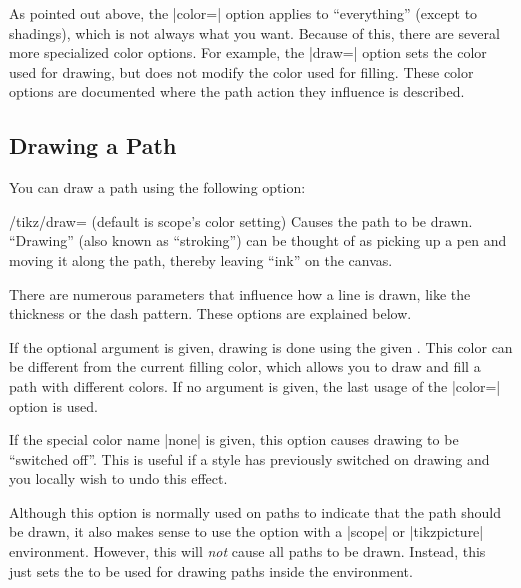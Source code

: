 As pointed out above, the |color=| option applies to ``everything'' (except to
shadings), which is not always what you want. Because of this, there are
several more specialized color options. For example, the |draw=| option sets
the color used for drawing, but does not modify the color used for filling.
These color options are documented where the path action they influence is
described.


\subsection{Drawing a Path}

You can draw a path using the following option:
%
\begin{key}{/tikz/draw= (default \normalfont is scope's color setting)}
    Causes the path to be drawn. ``Drawing'' (also known as ``stroking'') can
    be thought of as picking up a pen and moving it along the path, thereby
    leaving ``ink'' on the canvas.

    There are numerous parameters that influence how a line is drawn, like the
    thickness or the dash pattern. These options are explained below.

    If the optional  argument is given, drawing is done using the
    given . This color can be different from the current filling
    color, which allows you to draw and fill a path with different colors. If
    no  argument is given, the last usage of the |color=| option is
    used.

    If the special color name |none| is given, this option causes drawing to be
    ``switched off''. This is useful if a style has previously switched on
    drawing and you locally wish to undo this effect.

    Although this option is normally used on paths to indicate that the path
    should be drawn, it also makes sense to use the option with a |{scope}| or
    |{tikzpicture}| environment. However, this will \emph{not} cause all paths
    to be drawn. Instead, this just sets the  to be used for
    drawing paths inside the environment.
\begin{codeexample}[]
\end{codeexample}
\end{key}

